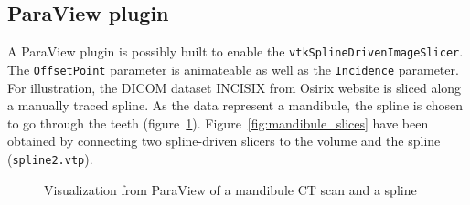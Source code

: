 \documentclass{InsightArticle}
\begin{document}
\subsection{ParaView plugin}
%
A ParaView plugin is possibly built to enable the 
\verb!vtkSplineDrivenImageSlicer!. The \verb!OffsetPoint! parameter is
animateable as well as the \verb!Incidence! parameter. For illustration, the
DICOM dataset INCISIX from Osirix website \cite{INCISIX} is sliced along
a manually traced spline. As the data represent a mandibule, the spline is
chosen
to go through the teeth (figure~\ref{fig:mandibule_spline}). 
Figure~\ref{fig:mandibule_slices} have been obtained by connecting two 
spline-driven slicers to the volume and the spline (\verb!spline2.vtp!).
%
\begin{figure}
\centering
{}
\caption{Visualization from ParaView of a mandibule CT scan and a spline}
\label{fig:mandibule_spline}
\end{figure}
%
\end{document}
